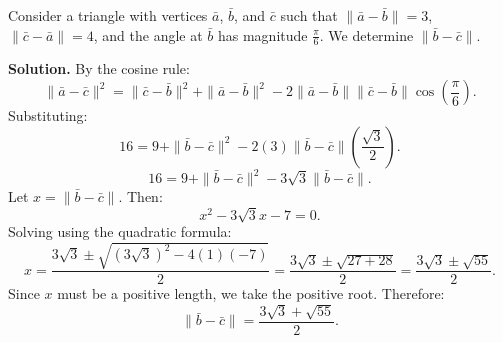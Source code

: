 \begin{examplebox}
Consider a triangle with vertices $\bar{a}$, $\bar{b}$, and $\bar{c}$ such that $\|\bar{a} - \bar{b}\| = 3$, $\|\bar{c} - \bar{a}\| = 4$, and the angle at $\bar{b}$ has magnitude $\frac{\pi}{6}$. We determine $\|\bar{b} - \bar{c}\|$.

\vspace{0.5em}
\textbf{Solution.} By the cosine rule:
\[
\|\bar{a} - \bar{c}\|^2 = \|\bar{c} - \bar{b}\|^2 + \|\bar{a} - \bar{b}\|^2 - 2\|\bar{a} - \bar{b}\|\|\bar{c} - \bar{b}\|\cos\left(\frac{\pi}{6}\right).
\]
Substituting:
\[
16 = 9 + \|\bar{b} - \bar{c}\|^2 - 2(3)\|\bar{b} - \bar{c}\|\left(\frac{\sqrt{3}}{2}\right).
\]
\[
16 = 9 + \|\bar{b} - \bar{c}\|^2 - 3\sqrt{3}\|\bar{b} - \bar{c}\|.
\]
Let $x = \|\bar{b} - \bar{c}\|$. Then:
\[
x^2 - 3\sqrt{3}x - 7 = 0.
\]
Solving using the quadratic formula:
\[
x = \frac{3\sqrt{3} \pm \sqrt{(3\sqrt{3})^2 - 4(1)(-7)}}{2} = \frac{3\sqrt{3} \pm \sqrt{27+28}}{2} = \frac{3\sqrt{3} \pm \sqrt{55}}{2}.
\]
Since $x$ must be a positive length, we take the positive root. Therefore:
\[
\|\bar{b} - \bar{c}\| = \frac{3\sqrt{3} + \sqrt{55}}{2}.
\]
\end{examplebox}


\newpage